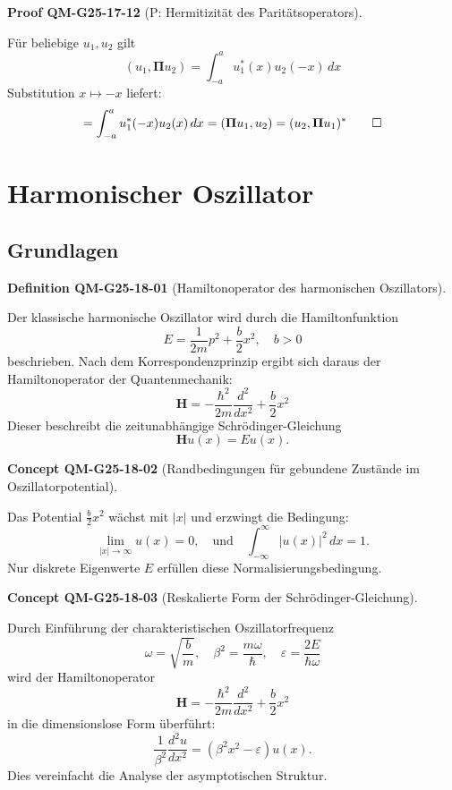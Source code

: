 \documentclass[10pt, letterpaper]{article}
\newcommand{\CustomHeading}[3]{%
  \par\medskip\noindent%
  \textbf{#1 #2} \textnormal{(#3)}.\enskip%
}
\newenvironment{DEF}[2]{\CustomHeading{Definition}{#1}{#2}}{}
\newenvironment{CONC}[2]{\CustomHeading{Concept}{#1}{#2}}{}
\newenvironment{PROOF}[2]{\CustomHeading{Proof}{#1}{#2}}{}
\begin{document}
\begin{PROOF}{QM-G25-17-12}{P: Hermitizität des Paritätsoperators}
Für beliebige $u_1, u_2$ gilt
\[
(u_1, \boldsymbol{\Pi} u_2) = \int_{-a}^{a} u_1^*(x) u_2(-x)\, dx
\]
Substitution $x \mapsto -x$ liefert:
\[
= \int_{-a}^{a} u_1^*(-x) u_2(x)\, dx = (\boldsymbol{\Pi} u_1, u_2) = (u_2, \boldsymbol{\Pi} u_1)^*
\qed
\]
\end{PROOF}

\section{Harmonischer Oszillator}

\subsection{Grundlagen}

\begin{DEF}{QM-G25-18-01}{Hamiltonoperator des harmonischen Oszillators}
Der klassische harmonische Oszillator wird durch die Hamiltonfunktion
\[
E=\frac{1}{2m}p^2 + \frac{b}{2}x^2, \quad b > 0
\]
beschrieben. Nach dem Korrespondenzprinzip ergibt sich daraus der Hamiltonoperator der Quantenmechanik:
\[
\mathbf{H} = -\frac{\hbar^2}{2m}\frac{d^2}{dx^2} + \frac{b}{2}x^2
\]
Dieser beschreibt die zeitunabhängige Schrödinger-Gleichung
\[
\mathbf{H} u(x) = E u(x).
\]
\end{DEF}

\begin{CONC}{QM-G25-18-02}{Randbedingungen für gebundene Zustände im Oszillatorpotential}
Das Potential $\frac{b}{2}x^2$ wächst mit $|x|$ und erzwingt die Bedingung:
\[
\lim_{|x|\to\infty} u(x) = 0, \quad \text{und} \quad \int_{-\infty}^{\infty} |u(x)|^2 \, dx = 1.
\]
Nur diskrete Eigenwerte $E$ erfüllen diese Normalisierungsbedingung.
\end{CONC}

\begin{CONC}{QM-G25-18-03}{Reskalierte Form der Schrödinger-Gleichung}
Durch Einführung der charakteristischen Oszillatorfrequenz
\[
\omega = \sqrt{\frac{b}{m}}, \quad \beta^2 = \frac{m\omega}{\hbar}, \quad \varepsilon = \frac{2E}{\hbar\omega}
\]
wird der Hamiltonoperator
\[
\mathbf{H} = -\frac{\hbar^2}{2m} \frac{d^2}{dx^2} + \frac{b}{2} x^2
\]
in die dimensionslose Form überführt:
\[
\frac{1}{\beta^2} \frac{d^2 u}{dx^2} = \left( \beta^2 x^2 - \varepsilon \right) u(x).
\]
Dies vereinfacht die Analyse der asymptotischen Struktur.
\end{CONC}
\end{document}
